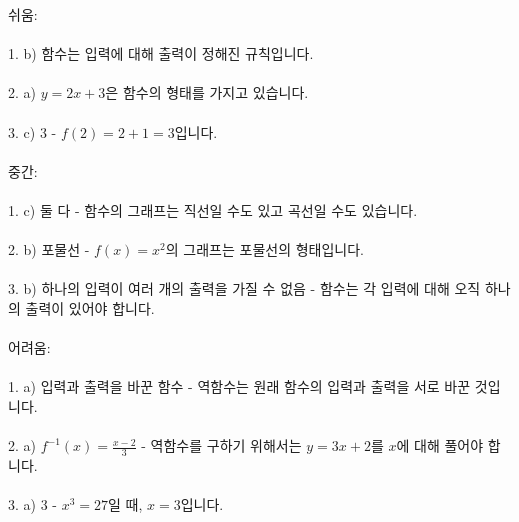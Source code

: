 \documentclass[fleqn]{article}
\begin{document}
      
       

쉬움: \\\\ 
1. b) 함수는 입력에 대해 출력이 정해진 규칙입니다. \\\\
2. a) $y = 2x + 3$은 함수의 형태를 가지고 있습니다. \\\\
3. c) 3 - $f(2) = 2 + 1 = 3$입니다. \\\\
  
중간: \\\\  
1. c) 둘 다 - 함수의 그래프는 직선일 수도 있고 곡선일 수도 있습니다. \\\\
2. b) 포물선 - $f(x) = x^2$의 그래프는 포물선의 형태입니다. \\\\
3. b) 하나의 입력이 여러 개의 출력을 가질 수 없음 - 함수는 각 입력에 대해 오직 하나의 출력이 있어야 합니다. \\\\

어려움: \\\\  
1. a) 입력과 출력을 바꾼 함수 - 역함수는 원래 함수의 입력과 출력을 서로 바꾼 것입니다. \\\\
2. a) $f^{-1}(x) = \frac{x-2}{3}$ - 역함수를 구하기 위해서는 $y = 3x + 2$를 $x$에 대해 풀어야 합니다. \\\\
3. a) 3 - $x^3 = 27$일 때, $x = 3$입니다. \\\\      
      
\end{document}
